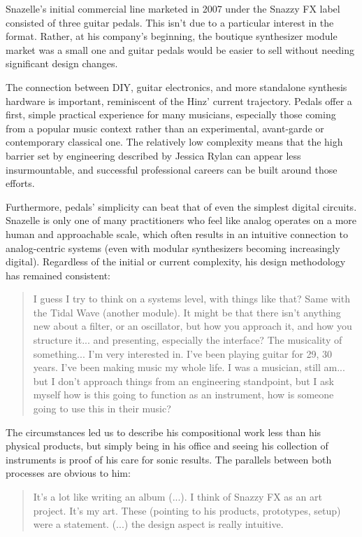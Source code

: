 Snazelle's initial commercial line marketed in 2007 under the Snazzy FX label consisted of three guitar pedals. This isn't due to a particular interest in the format. Rather, at his company's beginning, the boutique synthesizer module market was a small one and guitar pedals would be easier to sell without needing significant design changes. 

The connection between DIY, guitar electronics, and more standalone synthesis hardware is important, reminiscent of the Hinz' current trajectory. Pedals offer a first, simple practical experience for many musicians, especially those coming from a popular music context rather than an experimental, avant-garde or contemporary classical one. The relatively low complexity means that the high barrier set by engineering described by Jessica Rylan can appear less insurmountable, and successful professional careers can be built around those efforts. 

Furthermore, pedals' simplicity can beat that of even the simplest digital circuits. Snazelle is only one of many practitioners who feel like analog operates on a more human and approachable scale, which often results in an intuitive connection to analog-centric systems (even with modular synthesizers becoming increasingly digital). Regardless of the initial or current complexity, his design methodology has remained consistent: 

\begin{quote}
	I guess I try to think on a systems level, with things like that? Same with the Tidal Wave (another module). It might be that there isn’t anything new about a filter, or an oscillator, but how you approach it, and how you structure it... and presenting, especially the interface? The musicality of something... I’m very interested in. I’ve been playing guitar for 29, 30 years. I’ve been making music my whole life. I was a musician, still am... but I don’t approach things from an engineering standpoint, but I ask myself how is this going to function as an instrument, how is someone going to use this in their music?
\end{quote}

The circumstances led us to describe his compositional work less than his physical products, but simply being in his office and seeing his collection of instruments is proof of his care for sonic results. The parallels between both processes are obvious to him: 

\begin{quote}
	It's a lot like writing an album (...). I think of Snazzy FX as an art project. It's my art. These (pointing to his products, prototypes, setup) were a statement. (...) the design aspect is really intuitive.
\end{quote} 


